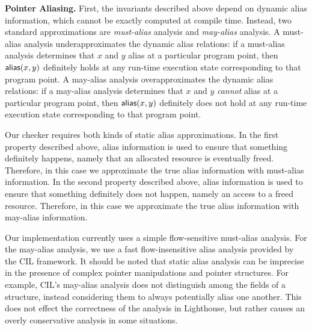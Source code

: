 \smallskip\noindent
{\bf Pointer Aliasing.}
First, the invariants described above depend on dynamic alias
information, which cannot be exactly computed at compile time.
Instead, two standard approximations are {\em must-alias} analysis and
{\em may-alias} analysis.  A must-alias analysis underapproximates the
dynamic alias relations:  if a must-alias analysis determines that $x$
and $y$ alias at a particular program point, then ${\mathsf{alias}}(x,y)$
definitely holds at any run-time execution state corresponding to that
program point.  A may-alias analysis overapproximates the dynamic
alias relations:  if a may-alias analysis determines that $x$ and $y$
{\em cannot} alias at a particular program point, then ${\mathsf{alias}}(x,y)$
definitely does not hold at any run-time execution state corresponding
to that program point.

Our checker requires both kinds of static alias approximations.  In
the first property described above, alias information is used to
ensure that something definitely happens, namely that an allocated
resource is eventually freed.  Therefore, in this case we approximate
the true alias information with must-alias information.  In the second
property described above, alias information is used to ensure that
something definitely does not happen, namely an access to a freed
resource.  Therefore, in this case we approximate the true alias
information with may-alias information.

Our implementation currently uses a simple flow-sensitive must-alias
analysis.  For the may-alias analysis, we use a fast flow-insensitive
alias analysis provided by the CIL framework.  It should be noted that 
static alias analysis
can be imprecise in the presence of complex pointer
manipulations and pointer structures.  For example, CIL's may-alias
analysis does not distinguish among the fields of a structure, instead
considering them to always potentially alias one another.  This does not
effect the correctness of the analysis in Lighthouse, but rather causes an overly 
conservative analysis in some situations.

